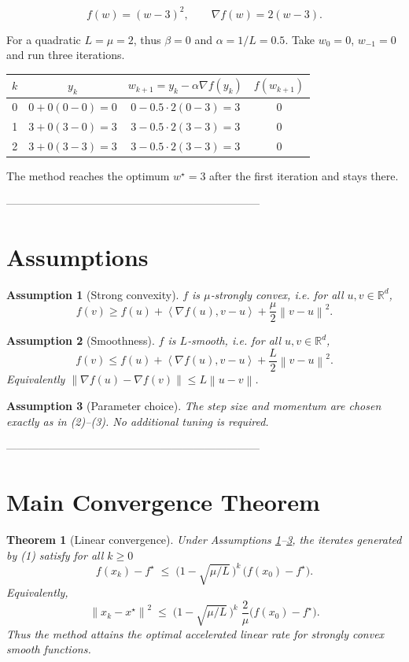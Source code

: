 \documentclass{article}
\newtheorem{theorem}{Theorem}
\newtheorem{assumption}{Assumption}
\newcommand{\norm}[1]{\left\lVert#1\right\rVert}
\newcommand{\inner}[2]{\left\langle #1,#2\right\rangle}
\begin{document}
\[
f(w)= (w-3)^{2},\qquad \nabla f(w)=2(w-3).
\]

For a quadratic $L=\mu=2$, thus $\beta=0$ and $\alpha=1/L=0.5$.
Take $w_{0}=0$, $w_{-1}=0$ and run three iterations.

\begin{center}
\begin{tabular}{c|c|c|c}
$k$ & $y_{k}$ & $w_{k+1}=y_{k}-\alpha\nabla f(y_{k})$ & $f(w_{k+1})$\\ \hline
0 & $0+0(0-0)=0$ & $0-0.5\cdot 2(0-3)=3$ & $0$\\
1 & $3+0(3-0)=3$ & $3-0.5\cdot 2(3-3)=3$ & $0$\\
2 & $3+0(3-3)=3$ & $3-0.5\cdot 2(3-3)=3$ & $0$\\
\end{tabular}
\end{center}
The method reaches the optimum $w^{\star}=3$ after the first iteration and stays there.

---------------------------------------------------------------------

\section*{Assumptions}
\begin{assumption}[Strong convexity]\label{as:strong}
$f$ is $\mu$‑strongly convex, i.e. for all $u,v\in\mathbb{R}^{d}$,
\[
f(v)\ge f(u)+\inner{\nabla f(u)}{v-u}+\frac{\mu}{2}\norm{v-u}^{2}.
\tag{4}
\]
\end{assumption}
\begin{assumption}[Smoothness]\label{as:smooth}
$f$ is $L$‑smooth, i.e. for all $u,v\in\mathbb{R}^{d}$,
\[
f(v)\le f(u)+\inner{\nabla f(u)}{v-u}+\frac{L}{2}\norm{v-u}^{2}.
\tag{5}
\]
Equivalently $\norm{\nabla f(u)-\nabla f(v)}\le L\norm{u-v}$.
\end{assumption}
\begin{assumption}[Parameter choice]\label{as:param}
The step size and momentum are chosen exactly as in (2)–(3). No additional
tuning is required.
\end{assumption}

---------------------------------------------------------------------

\section*{Main Convergence Theorem}
\begin{theorem}[Linear convergence]\label{thm:linear}
Under Assumptions \ref{as:strong}–\ref{as:param}, the iterates generated by
(1) satisfy for all $k\ge 0$
\[
f(x_{k})-f^{\star}\;\le\;\bigl(1-\sqrt{\mu/L}\,\bigr)^{k}\,
\bigl(f(x_{0})-f^{\star}\bigr).
\tag{6}
\]
Equivalently,
\[
\norm{x_{k}-x^{\star}}^{2}\;\le\;
\bigl(1-\sqrt{\mu/L}\,\bigr)^{k}\;
\frac{2}{\mu}\bigl(f(x_{0})-f^{\star}\bigr).
\tag{7}
\]
Thus the method attains the optimal accelerated linear rate for strongly
convex smooth functions.
\end{theorem}
\end{document}
